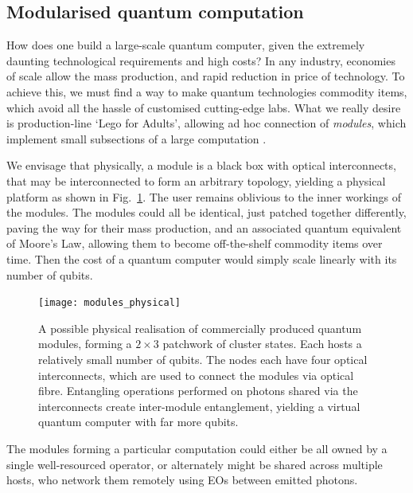 %
%

\subsection{Modularised quantum computation} \label{sec:module} 

How does one build a large-scale quantum computer, given the extremely daunting technological requirements and high costs? In any industry, economies of scale allow the mass production, and rapid reduction in price of technology. To achieve this, we must find a way to make quantum technologies commodity items, which avoid all the hassle of customised cutting-edge labs. What we really desire is production-line `Lego for Adults{\texttrademark}', allowing ad hoc connection of \textit{modules}, which implement small subsections of a large computation \cite{bib:FowlerPrivate}.

We envisage that physically, a module is a black box with optical interconnects, that may be interconnected to form an arbitrary topology, yielding a physical platform as shown in Fig.~\ref{fig:modules_physical}. The user remains oblivious to the inner workings of the modules. The modules could all be identical, just patched together differently, paving the way for their mass production, and an associated quantum equivalent of Moore's Law, allowing them to become off-the-shelf commodity items over time. Then the cost of a quantum computer would simply scale linearly with its number of qubits.

\begin{figure}[htpb]
	\texttt{[image: modules\_physical]}
	\caption{A possible physical realisation of commercially produced quantum modules, forming a \mbox{$2\times 3$} patchwork of cluster states. Each hosts a relatively small number of qubits. The nodes each have four optical interconnects, which are used to connect the modules via optical fibre. Entangling operations performed on photons shared via the interconnects create inter-module entanglement, yielding a virtual quantum computer with far more qubits.}\label{fig:modules_physical}
\end{figure}

The modules forming a particular computation could either be all owned by a single well-resourced operator, or alternately might be shared across multiple hosts, who network them remotely using EOs between emitted photons.

